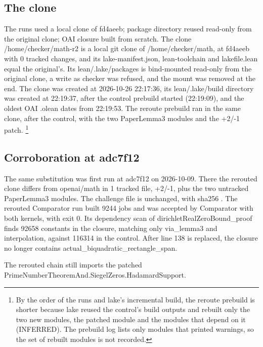 \subsection{The clone}

The runs used a local clone of fd4aeeb; package directory reused read-only from the original clone; OAI closure built from scratch.
The clone /home/checker/math-r2 is a local git clone of /home/checker/math, at fd4aeeb with 0 tracked changes, and its lake-manifest.json, lean-toolchain and lakefile.lean equal the original's.
Its lean/.lake/packages is bind-mounted read-only from the original clone, a write as checker was refused, and the mount was removed at the end.
The clone was created at 2026-10-26 22:17:36, its lean/.lake/build directory was created at 22:19:37, after the control prebuild started (22:19:09), and the oldest OAI .olean dates from 22:19:53.
The reroute prebuild ran in the same clone, after the control, with the two PaperLemma3 modules and the +2/-1 patch.
\footnote{By the order of the runs and lake's incremental build, the reroute prebuild is shorter because lake reused the control's build outputs and rebuilt only the two new modules, the patched module and the modules that depend on it (INFERRED).
The prebuild log lists only modules that printed warnings, so the set of rebuilt modules is not recorded.
}

\subsection{Corroboration at adc7f12}

The same substitution was first run at adc7f12 on 2026-10-09.
There the rerouted clone differs from openai/math in 1 tracked file, +2/-1, plus the two untracked PaperLemma3 modules.
The challenge file is unchanged, with sha256 .
The rerouted Comparator run built 9244 jobs and was accepted by Comparator with both kernels, with exit 0.
Its dependency scan of dirichletRealZeroBound\_proof finds 92658 constants in the closure, matching only via\_lemma3 and interpolation, against 116314 in the control.
After line 138 is replaced, the closure no longer contains actual\_biquadratic\_rectangle\_span.

The rerouted chain still imports the patched PrimeNumberTheoremAnd.SiegelZeros.HadamardSupport.

